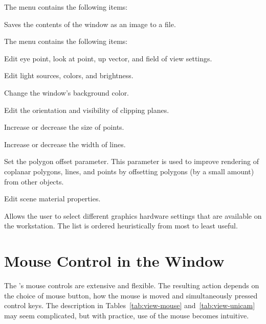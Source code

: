 \begin{description}
   The  menu contains the following items:

  \begin{description}
     Saves the
    contents of the \viewer{} window as an image to a file.
  \end{description}
  
   The  menu contains the following items:
  \begin{description}
     Edit eye point, look
    at point, up vector, and field of view settings.

     Edit light sources,
    colors, and brightness.

     Change the \viewer{}
    window's background color.

     Edit the orientation and visibility
    of clipping planes.

     Increase or decrease the size of points.

     Increase or decrease the width of lines.
    
     Set the polygon offset parameter.
    This parameter is used to improve rendering of coplanar
    polygons, lines, and points by offsetting polygons (by a small
    amount) from other objects.

     Edit scene material properties.
  \end{description}

   Allows the user to select different
  graphics hardware settings that are available on the workstation.
  The list is ordered heuristically from most to least useful.
\end{description}

\section{Mouse Control in the \viewer{} Window}
\label{sec:view-mouse} 

The \viewer{}'s mouse controls are extensive and flexible.  The
resulting action depends on the choice of mouse button, how the mouse
is moved and simultaneously pressed control keys.  The description in
Tables~\ref{tab:view-mouse} and~\ref{tab:view-unicam} may seem
complicated, but with practice, use of the mouse becomes intuitive.


